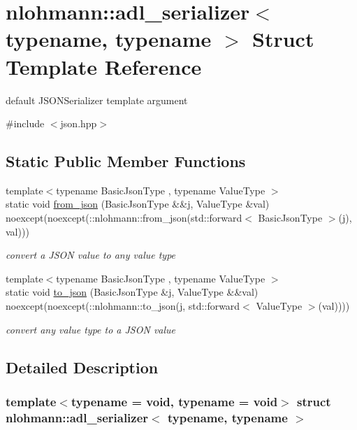 \hypertarget{structnlohmann_1_1adl__serializer}{}\section{nlohmann\+::adl\+\_\+serializer$<$ typename, typename $>$ Struct Template Reference}
\label{structnlohmann_1_1adl__serializer}


default J\+S\+O\+N\+Serializer template argument  




{\ttfamily \#include $<$json.\+hpp$>$}

\subsection*{Static Public Member Functions}
\begin{DoxyCompactItemize}
\item 
{\footnotesize template$<$typename Basic\+Json\+Type , typename Value\+Type $>$ }\\static void \mbox{\hyperlink{structnlohmann_1_1adl__serializer_ab39cad07c1a2bf4414d6cae5215b4e7a}{from\+\_\+json}} (Basic\+Json\+Type \&\&j, Value\+Type \&val) noexcept(noexcept(\+::nlohmann\+::from\+\_\+json(std\+::forward$<$ Basic\+Json\+Type $>$(j), val)))
\begin{DoxyCompactList}\small\item\em convert a J\+S\+ON value to any value type \end{DoxyCompactList}\item 
{\footnotesize template$<$typename Basic\+Json\+Type , typename Value\+Type $>$ }\\static void \mbox{\hyperlink{structnlohmann_1_1adl__serializer_adf8cd96afe6ab243b67392dfe35ace89}{to\+\_\+json}} (Basic\+Json\+Type \&j, Value\+Type \&\&val) noexcept(noexcept(\+::nlohmann\+::to\+\_\+json(j, std\+::forward$<$ Value\+Type $>$(val))))
\begin{DoxyCompactList}\small\item\em convert any value type to a J\+S\+ON value \end{DoxyCompactList}\end{DoxyCompactItemize}


\subsection{Detailed Description}
\subsubsection*{template$<$typename = void, typename = void$>$\newline
struct nlohmann\+::adl\+\_\+serializer$<$ typename, typename $>$}

